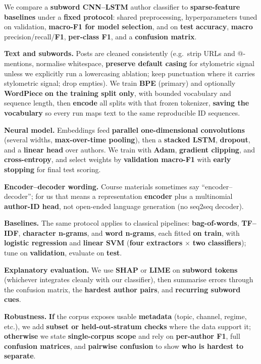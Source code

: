\documentclass[11pt]{article}
\begin{document}
We compare a \textbf{subword {CNN}--{LSTM}} author classifier to \textbf{sparse-feature baselines} under a \textbf{fixed protocol}: shared preprocessing, hyperparameters tuned on validation, \textbf{macro-{F1} for model selection}, and on \textbf{test} \textbf{accuracy}, \textbf{macro} precision/recall/\textbf{{F1}}, \textbf{per-class {F1}}, and a \textbf{confusion matrix}.

\noindent\textbf{Text and subwords.} Posts are cleaned consistently (e.g.\ strip {URLs} and @-mentions, normalise whitespace, \textbf{preserve default casing} for stylometric signal unless we explicitly run a lowercasing ablation; keep punctuation where it carries stylometric signal; drop empties). We train \textbf{{BPE}} (primary) and optionally \textbf{{WordPiece}} \textbf{on the training split only}, with bounded vocabulary and sequence length, then \textbf{encode} all splits with that frozen tokenizer, \textbf{saving the vocabulary} so every run maps text to the same reproducible {ID} sequences.

\noindent\textbf{Neural model.} Embeddings feed \textbf{parallel one-dimensional convolutions} (several widths, \textbf{max-over-time pooling}), then a \textbf{stacked {LSTM}}, \textbf{dropout}, and a \textbf{linear head} over authors. We train with \textbf{Adam}, \textbf{gradient clipping}, and \textbf{cross-entropy}, and select weights by \textbf{validation macro-{F1}} with \textbf{early stopping} for final test scoring.

\noindent\textbf{Encoder--decoder wording.} Course materials sometimes say ``encoder--decoder''; for us that means a representation \textbf{encoder} plus a multinomial \textbf{author-ID head}, not open-ended language generation (no seq2seq decoder).

\noindent\textbf{Baselines.} The same protocol applies to classical pipelines: \textbf{bag-of-words}, \textbf{{TF--IDF}}, \textbf{character {n}-grams}, and \textbf{word {n}-grams}, each fitted \textbf{on train}, with \textbf{logistic regression} and \textbf{linear {SVM}} (\textbf{four extractors} $\times$ \textbf{two classifiers}); tune on \textbf{validation}, evaluate on \textbf{test}.

\noindent\textbf{Explanatory evaluation.} We use \textbf{{SHAP}} or \textbf{{LIME}} on \textbf{subword tokens} (whichever integrates cleanly with our classifier), then summarise errors through the confusion matrix, the \textbf{hardest author pairs}, and \textbf{recurring subword cues}.

\noindent\textbf{Robustness.} \textbf{If} the corpus exposes usable \textbf{metadata} (topic, channel, regime, etc.), we add \textbf{subset or held-out-stratum checks} where the data support it; \textbf{otherwise} we state \textbf{single-corpus scope} and rely on \textbf{per-author {F1}}, full \textbf{confusion matrices}, and \textbf{pairwise confusion} to show \textbf{who is hardest to separate}.
\end{document}
